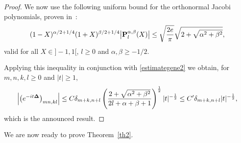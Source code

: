 \documentclass[11pt]{article}
\begin{document}
\begin{proof}
We now use the following uniform bound for the orthonormal Jacobi polynomials,
proven in~\cite{erdel}:
\begin{gather}\label{erdelyi}
(1-X)^{\alpha/2+1/4}
(1+X)^{\beta/2+1/4}\big|{\bf P}_l^{\alpha,\beta}(X)\big| \leq \sqrt{\frac{2 e}{\pi}}\sqrt{2+
\sqrt{\alpha^2+\beta^2}} ,
\end{gather}
valid for all $X\in]-1,1[$, $l\geq 0 $ and
$\alpha, \beta\geq-1/2$.

Applying this inequality in conjunction with \eqref{estimategene2} we
obtain, for $m,n,k,l\geq 0$ and   $|t|\geq 1$,
\begin{gather*}%
\left|\left(e^{-it{\bf\Delta}}\right)_{mn,kl}\right|
 \leq C \delta_{m+k,n+l}
\left(\frac{2+
\sqrt{\alpha^2+\beta^2}}
{2l+\alpha +\beta +1}\right)^{\frac 12}
|t|^{-\frac 12}\leq C' \delta_{m+k,n+l} |t|^{-\frac 12} ,
\end{gather*}
which is the announced result.
\end{proof}
\setcounter{section}{4}
\setcounter{subsection}{0}
\setcounter{subsubsection}{0}
\setcounter{equation}{32}
We are now ready to prove Theorem~\ref{th2}.
\end{document}
